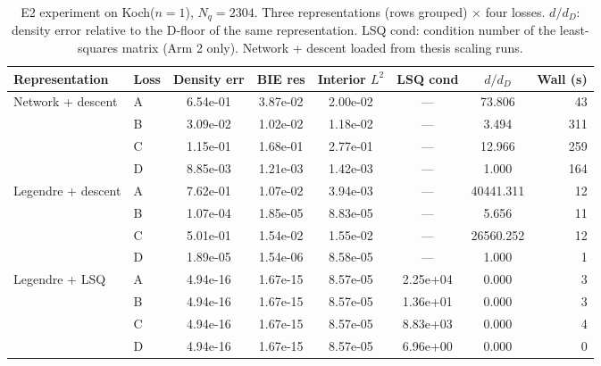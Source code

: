 \begin{table}[ht]
\centering
\caption{E2 experiment on Koch($n=1$), $N_q=2304$. Three representations (rows grouped) × four losses. $d/d_D$: density error relative to the D-floor of the same representation. LSQ cond: condition number of the least-squares matrix (Arm 2 only). Network + descent loaded from thesis scaling runs.}
\label{tab:e2-koch1}
\begin{tabular}{@{}llcccccr@{}}
\toprule
Representation & Loss & Density err & BIE res & Interior $L^2$ & LSQ cond & $d/d_D$ & Wall (s) \\
\midrule
  Network + descent & A & 6.54e-01 & 3.87e-02 & 2.00e-02 & — & 73.806 & 43 \\
   & B & 3.09e-02 & 1.02e-02 & 1.18e-02 & — & 3.494 & 311 \\
   & C & 1.15e-01 & 1.68e-01 & 2.77e-01 & — & 12.966 & 259 \\
   & D & 8.85e-03 & 1.21e-03 & 1.42e-03 & — & 1.000 & 164 \\
\midrule
  Legendre + descent & A & 7.62e-01 & 1.07e-02 & 3.94e-03 & — & 40441.311 & 12 \\
   & B & 1.07e-04 & 1.85e-05 & 8.83e-05 & — & 5.656 & 11 \\
   & C & 5.01e-01 & 1.54e-02 & 1.55e-02 & — & 26560.252 & 12 \\
   & D & 1.89e-05 & 1.54e-06 & 8.58e-05 & — & 1.000 & 1 \\
\midrule
  Legendre + LSQ & A & 4.94e-16 & 1.67e-15 & 8.57e-05 & 2.25e+04 & 0.000 & 3 \\
   & B & 4.94e-16 & 1.67e-15 & 8.57e-05 & 1.36e+01 & 0.000 & 3 \\
   & C & 4.94e-16 & 1.67e-15 & 8.57e-05 & 8.83e+03 & 0.000 & 4 \\
   & D & 4.94e-16 & 1.67e-15 & 8.57e-05 & 6.96e+00 & 0.000 & 0 \\
\bottomrule
\end{tabular}
\end{table}